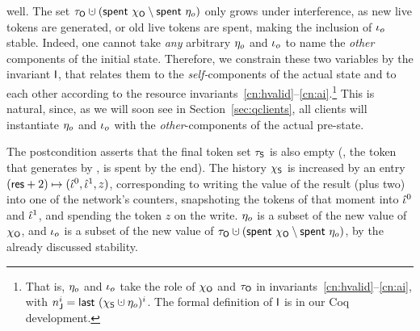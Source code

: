 well. The set $\tkno \hunion (\Tomb~\histo \setminus \Tomb~\gisto)$
only grows under interference, as new live tokens are generated, or
old live tokens are spent, making the inclusion of $\iota_o$
stable.
%
Indeed, one cannot take \emph{any} arbitrary $\eta_o$ and $\iota_o$ to
name the \emph{other} components of the initial state. Therefore, we
constrain these two variables by the invariant $\mathsf{I}$,
that relates them to the \emph{self-}components of the actual state
and to each other according to the resource
invariants~\ref{cn:hvalid}--\ref{cn:ai}.\footnote{That is, $\eta_o$
  and $\iota_o$ take the role of $\chi_{\mathsf{O}}$ and $\tau_{\mathsf{O}}$ in
  invariants~\ref{cn:hvalid}--\ref{cn:ai}, with $n^i_\joint =
  \last~(\hists \hunion \gisto)^i$. The formal definition of $\mathsf{I}$ is
  in our Coq development.} This is natural, since, as we will soon see
in Section~\ref{sec:qclients}, all clients will instantiate $\eta_o$
and $\iota_o$ with the \emph{other}-components of the actual pre-state.
%

The postcondition asserts that the final token set $\tau_{\mathsf{S}}$ is also
empty (\ie, the token that  generates by ,
is spent by the end). The history $\chi_{\mathsf{S}}$ is increased by an entry
$(\mathsf{res} + 2) \mapsto (\hat{\iota}^0, \hat{\iota}^1, z)$, corresponding to writing the
value of the result (plus two) into one of the network's counters,
snapshoting the tokens of that moment into $\hat{\iota}^0$ and $\hat{\iota}^1$,
and spending the token $z$ on the write. $\eta_o$ is a subset of the
new value of $\chi_{\mathsf{O}}$, and $\iota_o$ is a subset of the new value of
$\tkno \hunion (\Tomb~\histo \setminus \Tomb~\gisto)$, by the already
discussed stability.


